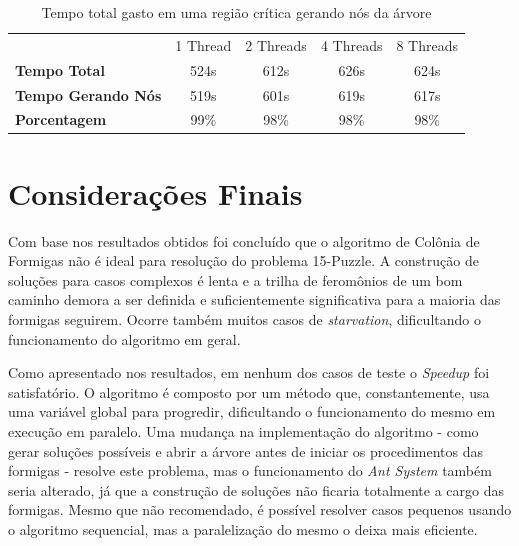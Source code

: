 \documentclass[12pt]{article}
\begin{document}
\begin{table}[!h]
\centering
\caption{Tempo total gasto em uma região crítica gerando nós da árvore}
\label{tabela4}
\begin{tabular}{lcccc}
\textbf{}            & 1 Thread & 2 Threads & 4 Threads & 8 Threads \\
\textbf{Tempo Total}       & 524s     & 612s      & 626s      & 624s      \\
\textbf{Tempo Gerando Nós} & 519s     & 601s      & 619s      & 617s      \\
\textbf{Porcentagem}       & 99\%     & 98\%      & 98\%      & 98\%     
\end{tabular}
\end{table}


\section{Considerações Finais}
Com base nos resultados obtidos foi concluído que o algoritmo de Colônia de Formigas não é ideal para resolução do problema 15-Puzzle. A construção de soluções para casos complexos é lenta e a trilha de feromônios de um bom caminho demora a ser definida e suficientemente significativa para a maioria das formigas seguirem. Ocorre também muitos casos de  \textit{starvation}, dificultando o funcionamento do algoritmo em geral.

Como apresentado nos resultados, em nenhum dos casos de teste o \textit{Speedup} foi satisfatório. O algoritmo é composto por um método que, constantemente, usa uma variável global para progredir, dificultando o funcionamento do mesmo em execução em paralelo. Uma mudança na implementação do algoritmo - como gerar soluções possíveis e abrir a árvore antes de iniciar os procedimentos das formigas - resolve este problema, mas o funcionamento do \textit{Ant System} também seria alterado, já que a construção de soluções não ficaria totalmente a cargo das formigas. Mesmo que não recomendado, é possível resolver casos pequenos usando o algoritmo sequencial, mas a paralelização do mesmo o deixa mais eficiente.



\end{document}

